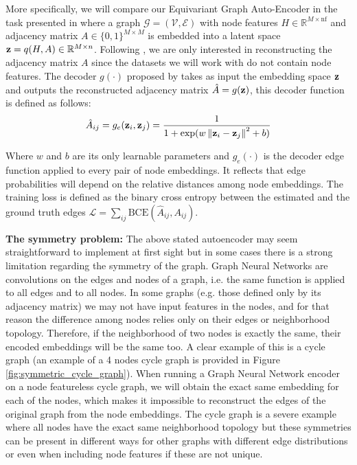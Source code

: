 More specifically, we will compare our Equivariant Graph Auto-Encoder in the task presented in \cite{liu2019graph} where a graph $\mathcal{G} = (\mathcal{V}, \mathcal{E})$ with node features $H \in \mathbb{R}^{M \times \text{nf}}$ and adjacency matrix $A \in \{0, 1\}^{M \times M}$ is embedded into a latent space $\mathbf{z} = q(H, A) \in \mathbb{R}^{M \times n}$. Following \cite{kipf2016variational, liu2019graph}, we are only interested in reconstructing the adjacency matrix $A$ since the datasets we will work with do not contain node features. The decoder $g(\cdot)$ proposed by \cite{liu2019graph} takes as input the embedding space $\mathbf{z}$ and outputs the reconstructed adjacency matrix $\hat{A} = g(\mathbf{z})$, this decoder function is defined as follows:
\begin{equation} \label{eq:graph_decoder}
    \hat{A}_{ij} = g_e(\mathbf{z}_i, \mathbf{z}_j)=\frac{1}{1 + \mathrm{exp}(
w\left\|\mathbf{z}_{i}- \mathbf{z}_{j}\right\|^{2} + b
)}
\end{equation}

Where $w$ and $b$ are its only learnable parameters and $g_e(\cdot)$ is the decoder edge function applied to every pair of node embeddings. It reflects that edge probabilities will depend on the relative distances among node embeddings. The training loss is defined as the binary cross entropy between the estimated and the ground truth edges $\mathcal{L} = \sum_{ij}\mathrm{BCE}(\hat{A}_{ij}, A_{ij})$.


\textbf{The symmetry problem:} The above stated autoencoder may seem straightforward to implement at first sight but in some cases there is a strong limitation regarding the symmetry of the graph. Graph Neural Networks are convolutions on the edges and nodes of a graph, i.e. the same function is applied to all edges and to all nodes. In some graphs (e.g. those defined only by its adjacency matrix) we may not have input features in the nodes, and for that reason the difference among nodes relies only on their edges or neighborhood topology. Therefore, if the neighborhood of two nodes is exactly the same, their encoded embeddings will be the same too. A clear example of this is a cycle graph (an example of a 4 nodes cycle graph is provided in Figure \ref{fig:symmetric_cycle_graph}). When running a Graph Neural Network encoder on a node featureless cycle graph, we will obtain the exact same embedding for each of the nodes, which makes it impossible to reconstruct the edges of the original graph from the node embeddings. The cycle graph is a severe example where all nodes have the exact same neighborhood topology but these symmetries can be present in different ways for other graphs with different edge distributions or even when including node features if these are not unique.

